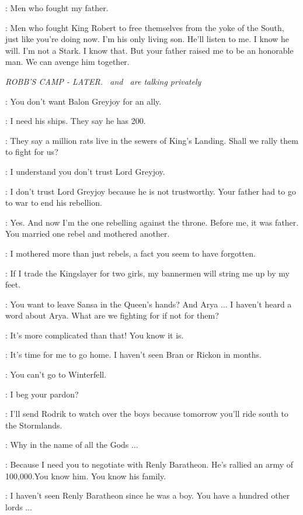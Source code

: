\ROBB: Men who fought my father.

\THEON: Men who fought King Robert to free themselves from the yoke of the South, just like you're doing now. I'm his only living son. He'll listen to me. I know he will. I'm not a Stark. I know that. But your father raised me to be an honorable man. We can avenge him together.


\scene

\textit{ROBB'S CAMP - LATER. \ROBB ~and \CATELYN ~are talking privately}

\CATELYN: You don't want Balon Greyjoy for an ally.

\ROBB: I need his ships. They say he has 200.

\CATELYN: They say a million rats live in the sewers of King's Landing. Shall we rally them to fight for us?

\ROBB: I understand you don't trust Lord Greyjoy.

\CATELYN: I don't trust Lord Greyjoy because he is not trustworthy. Your father had to go to war to end his rebellion.

\ROBB: Yes. And now I'm the one rebelling against the throne. Before me, it was father. You married one rebel and mothered another.

\CATELYN: I mothered more than just rebels, a fact you seem to have forgotten.

\ROBB: If I trade the Kingslayer for two girls, my bannermen will string me up by my feet.

\CATELYN: You want to leave Sansa in the Queen's hands? And Arya $\ldots$  I haven't heard a word about Arya. What are we fighting for if not for them?

\ROBB: It's more complicated than that! You know it is.

\CATELYN: It's time for me to go home. I haven't seen Bran or Rickon in months.

\ROBB: You can't go to Winterfell.

\CATELYN: I beg your pardon?

\ROBB: I'll send Rodrik to watch over the boys because tomorrow you'll ride south to the Stormlands.

\CATELYN: Why in the name of all the Gods $\ldots$

\ROBB: Because I need you to negotiate with Renly Baratheon. He's rallied an army of 100,000.You know him. You know his family.

\CATELYN: I haven't seen Renly Baratheon since he was a boy. You have a hundred other lords $\ldots$

